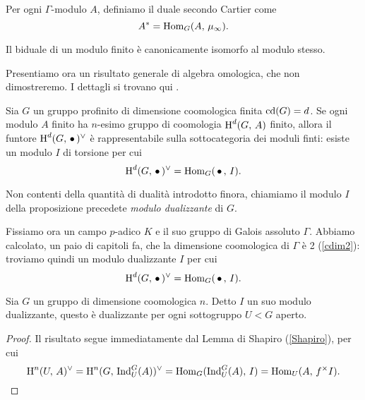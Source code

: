 \begin{definition}
	Per ogni $ \Gamma $-modulo $ A $, definiamo il duale secondo Cartier come
	\[ A^* = \operatorname{Hom}_G(A, \, \mu_\infty). \]
\end{definition}

\begin{proposition}
	Il biduale di un modulo finito è canonicamente isomorfo al modulo stesso.
\end{proposition}

Presentiamo ora un risultato generale di algebra omologica, che non dimostreremo. I dettagli si trovano qui \todo[ref].
\begin{proposition}
	Sia $ G $ un gruppo profinito di dimensione coomologica finita $ \operatorname{cd}(G) = d $. Se ogni modulo $ A $ finito ha $ n $-esimo gruppo di coomologia $ \operatorname{H}^d(G, \, A) $ finito, allora il funtore $ \operatorname{H}^d(G,\, \bullet\,)^\vee $ è rappresentabile sulla sottocategoria dei moduli finti: esiste un modulo $ I $ di torsione per cui
	\[ \operatorname{H}^d(G, \, \bullet \, )^\vee = \operatorname{Hom}_G(\,\bullet\, , \, I). \]
\end{proposition}

\begin{definition}
	Non contenti della quantità di dualità introdotto finora, chiamiamo il modulo $ I $ della proposizione precedete \emph{modulo dualizzante} di $ G $.
\end{definition}


Fissiamo ora un campo $ p $-adico $ K $ e il suo gruppo di Galois assoluto $ \Gamma $. Abbiamo calcolato, un paio di capitoli fa, che la dimensione coomologica di $ \Gamma $ è 2 (\ref{cdim2}): troviamo quindi un modulo dualizzante $ I $ per cui 
\[ \operatorname{H}^d(G, \, \bullet \, )^\vee = \operatorname{Hom}_G(\,\bullet\, , \, I). \]



\begin{lemma}
	Sia $ G $ un gruppo di dimensione coomologica $ n $. Detto $ I $ un suo modulo dualizzante, questo è dualizzante per ogni sottogruppo $ U < G $ aperto.
\end{lemma}
\begin{proof}
	Il risultato segue immediatamente dal Lemma di Shapiro (\ref{Shapiro}), per cui
	\[ \operatorname{H}^n(U, \, A)^\vee = \operatorname{H}^n(G, \, \operatorname{Ind}_U^G(A))^\vee = \operatorname{Hom}_G(\operatorname{Ind}_U^G(A), \, I) = \operatorname{Hom}_U(A, \, f^\times I). \]
\end{proof}

